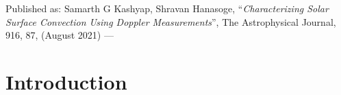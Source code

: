 {
Published as: 
\textnormal{{\color{denimdarkblue} Samarth G Kashyap}, 
Shravan Hanasoge,
``\emph{Characterizing Solar Surface Convection Using 
Doppler Measurements}'',
The Astrophysical Journal,} 916, 
\textnormal{87, (August 2021) --- \cite{SGK-2021-ApJ}}
}
\label{chap:p2-surface-convection}

\section{Introduction}\label{sec:p2-intro}
\lipsum
